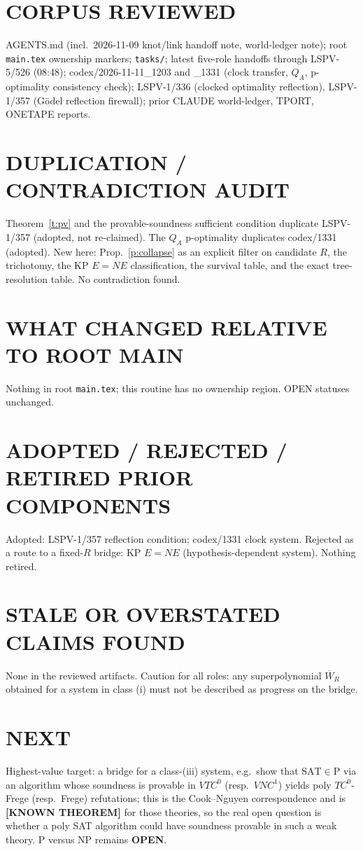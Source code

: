 \documentclass[11pt]{article}
\theoremstyle{remark}
\newcommand{\SAT}{\mathrm{SAT}}
\newcommand{\Wb}{\overline W}
\newcommand{\status}[1]{\textbf{[#1]}}
\begin{document}
\section*{CORPUS REVIEWED}
AGENTS.md (incl.\ 2026-11-09 knot/link handoff note, world-ledger note); root \texttt{main.tex}
ownership markers; \texttt{tasks/}; latest five-role handoffs through LSPV-5/526 (08:48);
codex/2026-11-11\_1203 and \_1331 (clock transfer, $Q_A$, p-optimality consistency check);
LSPV-1/336 (clocked optimality reflection), LSPV-1/357 (G\"odel reflection firewall);
prior CLAUDE world-ledger, TPORT, ONETAPE reports.

\section*{DUPLICATION / CONTRADICTION AUDIT}
Theorem~\ref{t:pv} and the provable-soundness sufficient condition duplicate LSPV-1/357
(adopted, not re-claimed). The $Q_A$ p-optimality duplicates codex/1331 (adopted). New here:
Prop.~\ref{p:collapse} as an explicit filter on candidate $R$, the trichotomy, the KP $E=NE$
classification, the survival table, and the exact tree-resolution table. No contradiction found.

\section*{WHAT CHANGED RELATIVE TO ROOT MAIN}
Nothing in root \texttt{main.tex}; this routine has no ownership region. OPEN statuses unchanged.

\section*{ADOPTED / REJECTED / RETIRED PRIOR COMPONENTS}
Adopted: LSPV-1/357 reflection condition; codex/1331 clock system. Rejected as a route to a
fixed-$R$ bridge: KP $E=NE$ (hypothesis-dependent system). Nothing retired.

\section*{STALE OR OVERSTATED CLAIMS FOUND}
None in the reviewed artifacts. Caution for all roles: any superpolynomial $\Wb_R$ obtained for a
system in class (i) must not be described as progress on the bridge.

\section*{NEXT}
Highest-value target: a bridge for a class-(iii) system, e.g.\ show that $\SAT\in\mathrm P$ via an
algorithm whose soundness is provable in $VTC^0$ (resp.\ $VNC^1$) yields poly $TC^0$-Frege
(resp.\ Frege) refutations; this is the Cook--Nguyen correspondence and is
\status{KNOWN THEOREM} for those theories, so the real open question is whether a poly SAT
algorithm could have soundness provable in such a weak theory. P versus NP remains \textbf{OPEN}.
\end{document}
